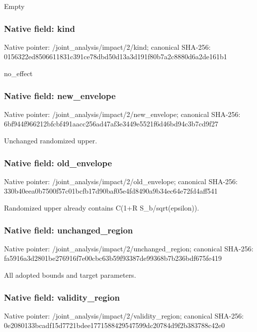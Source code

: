\documentclass[10pt,a4paper]{article}
\begin{document}
\begingroup\raggedright\sloppy Empty\par\endgroup

\subsubsection{Native field: kind}
Native pointer: /joint\_\allowbreak{}analysis/impact/2/kind; canonical SHA-256: 0156322ed8506611831c391ce78dbd50d13a3d191f80b7a2c8880d6a2de161b1

\begingroup\raggedright\sloppy no\_\allowbreak{}effect\par\endgroup

\subsubsection{Native field: new\_\allowbreak{}envelope}
Native pointer: /joint\_\allowbreak{}analysis/impact/2/new\_\allowbreak{}envelope; canonical SHA-256: 6bf944f966212bfcbf491aacc256ad47af3e3449e5521f6d46bd94c3b7cd9f27

\begingroup\raggedright\sloppy Unchanged randomized upper.\par\endgroup

\subsubsection{Native field: old\_\allowbreak{}envelope}
Native pointer: /joint\_\allowbreak{}analysis/impact/2/old\_\allowbreak{}envelope; canonical SHA-256: 330b40eea0b7500f57c01bcfb17d90baf05e4fd8490a9b34ec64e72fd4aff541

\begingroup\raggedright\sloppy Randomized upper already contains C(1+R S\_\allowbreak{}b/\allowbreak{}sqrt(epsilon)).\par\endgroup

\subsubsection{Native field: unchanged\_\allowbreak{}region}
Native pointer: /joint\_\allowbreak{}analysis/impact/2/unchanged\_\allowbreak{}region; canonical SHA-256: fa5916a3d2801be276916f7e00cbc63b59f93387de99368b7b236bdf675fe419

\begingroup\raggedright\sloppy All adopted bounds and target parameters.\par\endgroup

\subsubsection{Native field: validity\_\allowbreak{}region}
Native pointer: /joint\_\allowbreak{}analysis/impact/2/validity\_\allowbreak{}region; canonical SHA-256: 0e2080133bcadf15d7721bdee1771588429547599dc20784d9f2b383788c42e0
\end{document}
